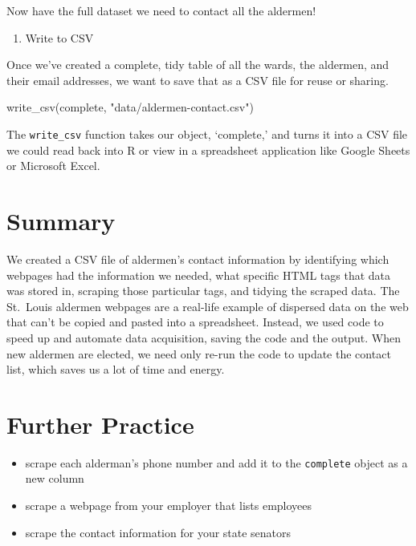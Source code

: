 \documentclass[
  krantz2]{krantz}
\makeatletter
\newenvironment{Shaded}{\begin{snugshade}}{\end{snugshade}}
\newcommand{\FunctionTok}[1]{\textcolor[rgb]{0,0,0}{#1}}
\newcommand{\NormalTok}[1]{#1}
\newcommand{\StringTok}[1]{\textcolor[rgb]{0.5,0.5,0.5}{#1}}
\providecommand{\tightlist}{%
  \setlength{\itemsep}{0pt}\setlength{\parskip}{0pt}}
\newenvironment{kframe}{%
\medskip{}
\setlength{\fboxsep}{.8em}
 \def\at@end@of@kframe{}%
 \ifinner\ifhmode%
  \def\at@end@of@kframe{\end{minipage}}%
  \begin{minipage}{\columnwidth}%
 \fi\fi%
 \def\FrameCommand##1{\hskip\@totalleftmargin \hskip-\fboxsep
 \colorbox{shadecolor}{##1}\hskip-\fboxsep
     \hskip-\linewidth \hskip-\@totalleftmargin \hskip\columnwidth}%
 \MakeFramed {\advance\hsize-\width
   \@totalleftmargin\z@ \linewidth\hsize
   \@setminipage}}%
 {\par\unskip\endMakeFramed%
 \at@end@of@kframe}
\renewenvironment{Shaded}{\begin{kframe}}{\end{kframe}}
\makeatother
\begin{document}
Now have the full dataset we need to contact all the aldermen!

\begin{enumerate}
\def\labelenumi{\arabic{enumi}.}
\setcounter{enumi}{2}
\tightlist
\item
  Write to CSV
\end{enumerate}

Once we've created a complete, tidy table of all the wards, the aldermen, and their email addresses, we want to save that as a CSV file for reuse or sharing.

\begin{Shaded}
\begin{Highlighting}[]
\FunctionTok{write\_csv}\NormalTok{(complete, }\StringTok{"data/aldermen{-}contact.csv"}\NormalTok{) }
\end{Highlighting}
\end{Shaded}

The \texttt{write\_csv} function takes our object, `complete,' and turns it into a CSV file we could read back into R or view in a spreadsheet application like Google Sheets or Microsoft Excel.

\hypertarget{rvest-summary}{%
\section{Summary}\label{rvest-summary}}

We created a CSV file of aldermen's contact information by identifying which webpages had the information we needed, what specific HTML tags that data was stored in, scraping those particular tags, and tidying the scraped data. The St.~Louis aldermen webpages are a real-life example of dispersed data on the web that can't be copied and pasted into a spreadsheet. Instead, we used code to speed up and automate data acquisition, saving the code and the output. When new aldermen are elected, we need only re-run the code to update the contact list, which saves us a lot of time and energy.

\hypertarget{rvest-study}{%
\section{Further Practice}\label{rvest-study}}

\begin{itemize}
\tightlist
\item
  scrape each alderman's phone number and add it to the \texttt{complete} object as a new column
\item
  scrape a webpage from your employer that lists employees
\item
  scrape the contact information for your state senators
\end{itemize}
\end{document}
